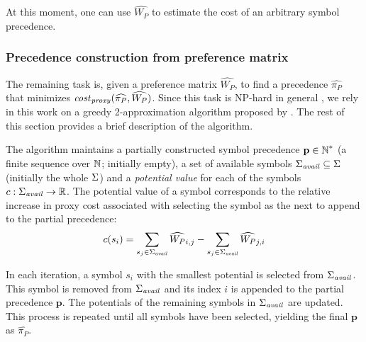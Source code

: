 \documentclass{ceurart}
\begin{document}
At this moment, one can use \(\widehat{W_P}\) to estimate the cost of an arbitrary symbol precedence.

\subsubsection{Precedence construction from preference matrix} \label{sect:ltot}

The remaining task is, given a preference matrix \(\widehat{W_P}\), to find a precedence \(\widehat{\pi_P}\)
that minimizes \(\operatorname{\mathit{\operatorname{\mathit{cost}}_{proxy}}}(\widehat{\pi_P}, \widehat{W_P})\).
Since this task is NP-hard in general \cite{Cohen2011},
we rely in this work on a greedy 2-approximation algorithm
proposed by \citet{Cohen2011}.
The rest of this section provides a brief description of the algorithm.

The algorithm maintains a partially constructed symbol precedence \(\mathbf{p} \in \operatorname{\mathbb{N}}^*\)
(a finite sequence over \(\operatorname{\mathbb{N}}\); initially empty),
a set of available symbols \(\mathit{\operatorname{\Sigma}_{avail}} \subseteq \operatorname{\Sigma}\) (initially the whole \(\operatorname{\Sigma}\))
and a \emph{potential value} for each of the symbols \(c: \mathit{\operatorname{\Sigma}_{avail}} \to \operatorname{\mathbb{R}}\).
The potential value of a symbol corresponds to the relative increase in proxy cost
associated with selecting the symbol as the next to append to the partial precedence:
\begin{align*}
c(s_i) = \sum_{s_j \in \mathit{\operatorname{\Sigma}_{avail}}} \widehat{W_P}_{i, j} - \sum_{s_j \in \mathit{\operatorname{\Sigma}_{avail}}} \widehat{W_P}_{j, i}
\end{align*}

In each iteration, a symbol \(s_i\) with the smallest potential is selected from \(\mathit{\operatorname{\Sigma}_{avail}}\).
This symbol is removed from \(\mathit{\operatorname{\Sigma}_{avail}}\)
and its index \(i\) is appended to the partial precedence \(\mathbf{p}\).
The potentials of the remaining symbols in \(\mathit{\operatorname{\Sigma}_{avail}}\) are updated.
This process is repeated until all symbols have been selected,
yielding the final \(\mathbf{p}\) as \(\widehat{\pi_P}\).


\end{document}
